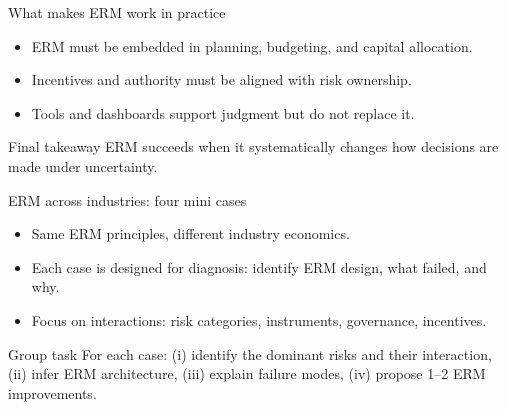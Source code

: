 \documentclass[aspectratio=169, 10pt]{beamer} %
\begin{document}
\begin{frame}{What makes ERM work in practice}

\begin{itemize}
  \item[$\bullet$] ERM must be embedded in planning, budgeting, and capital
  allocation.

  \item[$\bullet$] Incentives and authority must be aligned with risk ownership.

  \item[$\bullet$] Tools and dashboards support judgment but do not replace it.
\end{itemize}

\begin{block}{Final takeaway}
ERM succeeds when it systematically changes how decisions are made under
uncertainty.
\end{block}

\end{frame}


\begin{frame}{ERM across industries: four mini cases}
\begin{itemize}
  \item[$\bullet$] Same ERM principles, different industry economics.
  \item[$\bullet$] Each case is designed for diagnosis: identify ERM design, what failed, and why.
  \item[$\bullet$] Focus on interactions: risk categories, instruments, governance, incentives.
\end{itemize}
\begin{block}{Group task}
For each case: (i) identify the dominant risks and their interaction, (ii) infer ERM architecture, (iii) explain failure modes, (iv) propose 1--2 ERM improvements.
\end{block}
\end{frame}
\end{document}
